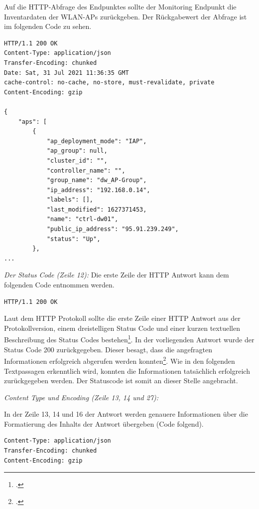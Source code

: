 Auf die HTTP-Abfrage des Endpunktes sollte der Monitoring Endpunkt die Inventardaten der WLAN-APs zurückgeben. Der Rückgabewert der Abfrage ist im folgenden Code zu sehen.

\small
\lstset{firstnumber=12}
\begin{lstlisting}
HTTP/1.1 200 OK
Content-Type: application/json
Transfer-Encoding: chunked
Date: Sat, 31 Jul 2021 11:36:35 GMT
cache-control: no-cache, no-store, must-revalidate, private
Content-Encoding: gzip
 
{
	"aps": [
		{
			"ap_deployment_mode": "IAP",
			"ap_group": null,
			"cluster_id": "",
			"controller_name": "",
			"group_name": "dw_AP-Group",
			"ip_address": "192.168.0.14",
			"labels": [],
			"last_modified": 1627371453,
			"name": "ctrl-dw01",
			"public_ip_address": "95.91.239.249",
			"status": "Up",
		},
...    
\end{lstlisting}

\emph{Der Status Code (Zeile 12):}
Die erste Zeile der HTTP Antwort kann dem folgenden Code entnommen werden.

\lstset{firstnumber=12}
\begin{lstlisting}
HTTP/1.1 200 OK
\end{lstlisting}

Laut dem HTTP Protokoll sollte die erste Zeile einer HTTP Antwort aus der Protokollversion, einem dreistelligen Status Code und einer kurzen textuellen Beschreibung des Status Codes bestehen\footcite[S. 39]{fielding_hypertext_1999}. In der vorliegenden Antwort wurde der Status Code 200 zurückgegeben. Dieser besagt, dass die angefragten Informationen erfolgreich abgerufen werden konnten\footcite[S. 58]{fielding_hypertext_1999}. Wie in den folgenden Textpassagen erkenntlich wird, konnten die Informationen tatsächlich erfolgreich zurückgegeben werden. Der Statuscode ist somit an dieser Stelle angebracht.

\emph{Content Type und Encoding (Zeile 13, 14 und 27):} 

In der Zeile 13, 14 und 16 der Antwort werden genauere Informationen über die Formatierung des Inhalts der Antwort übergeben (Code folgend). 

\lstset{firstnumber=13}
\begin{lstlisting}
Content-Type: application/json
Transfer-Encoding: chunked
Content-Encoding: gzip
\end{lstlisting}

